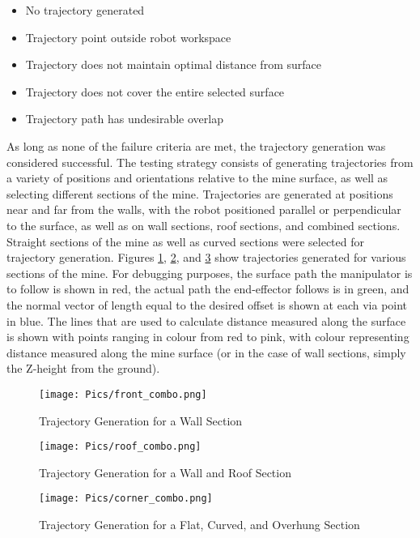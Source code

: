 \begin{itemize}
    \item No trajectory generated
    \item Trajectory point outside robot workspace
    \item Trajectory does not maintain optimal distance from surface
    \item Trajectory does not cover the entire selected surface
    \item Trajectory path has undesirable overlap
\end{itemize}

As long as none of the failure criteria are met, the trajectory generation was considered successful. The testing strategy consists of generating trajectories from a variety of positions and orientations relative to the mine surface, as well as selecting different sections of the mine. Trajectories are generated at positions near and far from the walls, with the robot positioned parallel or perpendicular to the surface, as well as on wall sections, roof sections, and combined sections. Straight sections of the mine as well as curved sections were selected for trajectory generation. Figures \ref{fig:traj1}, \ref{fig:traj2}, and \ref{fig:traj3} show trajectories generated for various sections of the mine. For debugging purposes, the surface path the manipulator is to follow is shown in red, the actual path the end-effector follows is in green, and the normal vector of length equal to the desired offset is shown at each via point in blue. The lines that are used to calculate distance measured along the surface is shown with points ranging in colour from red to pink, with colour representing distance measured along the mine surface (or in the case of wall sections, simply the Z-height from the ground).\\

\begin{figure}[h]
    \centering
    \texttt{[image: Pics/front\_combo.png]}
    \caption{Trajectory Generation for a Wall Section}
    \label{fig:traj1}
\end{figure}
\begin{figure}
    \centering
    \texttt{[image: Pics/roof\_combo.png]}
    \caption{Trajectory Generation for a Wall and Roof Section}
    \label{fig:traj2}
\end{figure}
\begin{figure}
    \centering
    \texttt{[image: Pics/corner\_combo.png]}
    \caption{Trajectory Generation for a Flat, Curved, and Overhung Section}
    \label{fig:traj3}
\end{figure}
\clearpage

